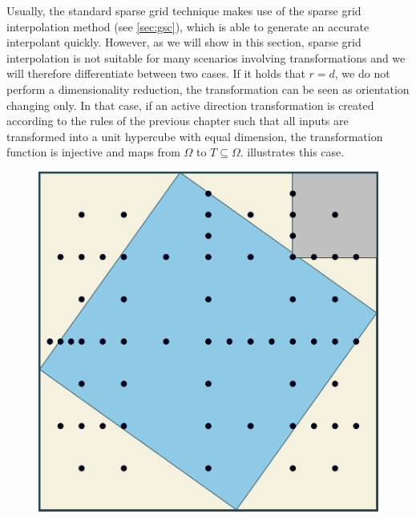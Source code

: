 \documentclass[
  a4paper,  %
  twoside,  %
  bibliography=totoc,
  headsepline,
  cleardoublepage=empty,
  parskip=half,
  draft=false
]{scrbook}
\begin{document}
Usually, the standard sparse grid technique makes use of the sparse grid interpolation method (see \cref{sec:gsc}), which is able to generate an accurate interpolant quickly.
However, as we will show in this section, sparse grid interpolation is not suitable for many scenarios involving transformations and we will therefore differentiate between two cases.
If it holds that $r=d$, \ie we do not perform a dimensionality reduction, the transformation can be seen as orientation changing only.
In that case, if an active direction transformation is created according to the rules of the previous chapter such that all inputs are transformed into a unit hypercube with equal dimension, the transformation function is injective and maps from $\Omega$ to $T \subseteq \Omega$.
 illustrates this case.

\begin{mdframed}[style=style]
\begin{figure}[H]
        \centering
\begin{minipage}{.49\textwidth}
        \centering
\label{fig:aligned_grid}
    \end{minipage}%
    \begin{minipage}{0.49\textwidth}
        \centering
   \includegraphics[width=0.8\linewidth]{graphics/aligned_grid}
   \vspace{2mm}
    \end{minipage}
\end{figure}
\end{mdframed}
\end{document}
